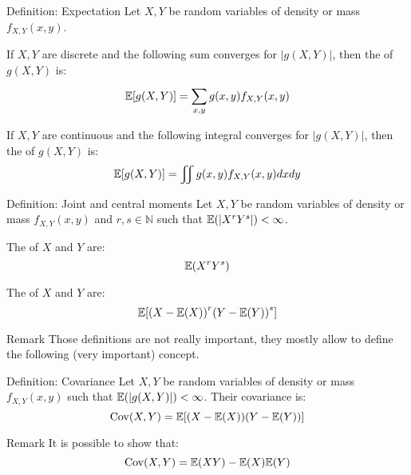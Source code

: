 \documentclass[a4paper]{article}
\begin{document}
\begin{parag}{Definition: Expectation}
    Let $X, Y$ be random variables of density or mass $f_{X, Y}\left(x, y\right)$.

    If $X, Y$ are discrete and the following sum converges for $\left|g\left(X, Y\right)\right|$, then the  of $g\left(X, Y\right)$ is: 
    \[\exval\left[g\left(X, Y\right)\right] = \sum_{x, y}^{} g\left(x, y\right)f_{X, Y}\left(x, y\right)\]
    
    If $X, Y$ are continuous and the following integral converges for $\left|g\left(X, Y\right)\right|$, then the  of $g\left(X, Y\right)$ is: 
    \[\exval\left[g\left(X, Y\right)\right] = \iint g\left(x, y\right) f_{X, Y}\left(x, y\right)dxdy\]
\end{parag}

\begin{parag}{Definition: Joint and central moments}
    Let $X, Y$ be random variables of density or mass $f_{X, Y}\left(x, y\right)$ and $r, s \in \mathbb{N}$ such that $\exval\left(\left|X^r Y^s\right|\right) < \infty$.

    The  of $X$ and $Y$ are: 
    \[\exval\left(X^r Y^s\right)\]
    
    The  of $X$ and $Y$ are: 
    \[\exval\left[\left(X - \exval\left(X\right)\right)^r \left(Y - \exval\left(Y\right)\right)^s\right] \]

    \begin{subparag}{Remark}
        Those definitions are not really important, they mostly allow to define the following (very important) concept.
    \end{subparag}
\end{parag}

\begin{parag}{Definition: Covariance}
    Let $X, Y$ be random variables of density or mass $f_{X, Y}\left(x, y\right)$ such that $\exval\left(\left|g\left(X,Y\right)\right|\right) < \infty$. Their covariance is: 
    \[\Cov\left(X, Y\right) = \exval\left[\left(X - \exval\left(X\right)\right)\left(Y - \exval\left(Y\right)\right)\right]\]
    \begin{subparag}{Remark}
        It is possible to show that: 
        \[\Cov\left(X, Y\right) = \exval\left(XY\right) - \exval\left(X\right)\exval\left(Y\right)\]
    \end{subparag}
\end{parag}
\end{document}

